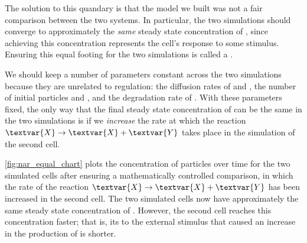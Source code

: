 The solution to this quandary is that the model we built was not a fair comparison between the two systems. In particular, the two simulations should converge to approximately the \textit{same} steady state concentration of , since achieving this concentration represents the cell's response to some stimulus. Ensuring this equal footing for the two simulations is called a .\\

\begin{qbox}\end{qbox}

We should keep a number of parameters constant across the two simulations because they are unrelated to regulation: the diffusion rates of  and , the number of initial particles  and , and the degradation rate of . With these parameters fixed, the only way that the final steady state concentration of  can be the same in the two simulations is if we \textit{increase} the rate at which the reaction $\textvar{X} \rightarrow \textvar{X} + \textvar{Y}$ takes place in the simulation of the second cell.

\autoref{fig:nar_equal_chart} plots the concentration of  particles over time for the two simulated cells after ensuring a mathematically controlled comparison, in which the rate of the reaction $\textvar{X} \rightarrow \textvar{X} + \textvar{Y}$ has been increased in the second cell. The two simulated cells now have approximately the same steady state concentration of . However, the second cell reaches this concentration faster; that is, its  to the external stimulus that caused an increase in the production of  is shorter.

